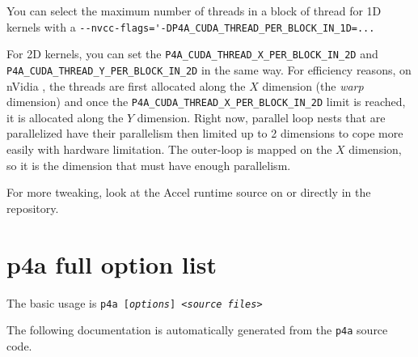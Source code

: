 \documentclass[a4paper]{article}
\begin{document}
You can select the maximum number of threads in a block of thread for 1D
kernels with a \verb|--nvcc-flags='-DP4A_CUDA_THREAD_PER_BLOCK_IN_1D=...|

For 2D kernels, you can set the \verb|P4A_CUDA_THREAD_X_PER_BLOCK_IN_2D|
and \verb|P4A_CUDA_THREAD_Y_PER_BLOCK_IN_2D| in the same way. For
efficiency reasons, on nVidia \Agpu, the threads are first allocated along
the $X$ dimension (the \emph{warp} dimension) and once the
\verb|P4A_CUDA_THREAD_X_PER_BLOCK_IN_2D| limit is reached, it is allocated
along the $Y$ dimension. Right now, parallel loop nests that are
parallelized have their parallelism then limited up to 2 dimensions to
cope more easily with \Acuda \Agpu hardware limitation. The outer-loop is
mapped on the $X$ \Agpu dimension, so it is the dimension that must have
enough parallelism.

For more tweaking, look at the \Apfa Accel runtime source on \url{} or
directly in the \Agit repository.


\section{p4a full option list}
\label{sec:options}

The basic usage is \texttt{p4a [\emph{options}] <\emph{source files}>}

The following documentation is automatically generated from the
\texttt{p4a} source code.



\end{document}
